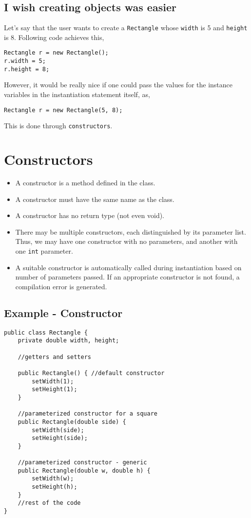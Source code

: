 \subsection{I wish creating objects was easier}

Let's say that the user wants to create a \texttt{Rectangle} whose \texttt{width} is 5 and \texttt{height} is 8. Following code achieves this,

\begin{lstlisting}
Rectangle r = new Rectangle();
r.width = 5;
r.height = 8;
\end{lstlisting}

However, it would be really nice if one could pass the values for the instance variables in the instantiation statement itself, as,

\begin{lstlisting}
Rectangle r = new Rectangle(5, 8);
\end{lstlisting}

This is done through \texttt{constructors}.

\section{Constructors}
\begin{itemize}
\item A constructor is a method defined in the class.
\item A constructor must have the same name as the class.
\item A constructor has no return type (not even void).
\item There may be multiple constructors, each distinguished by its parameter list. Thus, we may have one constructor with no parameters, and another with one \texttt{int} parameter.
\item A suitable constructor is automatically called during instantiation based on number of parameters passed. If an appropriate constructor is not found, a compilation error is generated.
\end{itemize}

\subsection{Example - Constructor}

\begin{lstlisting}[basicstyle=\tiny]
public class Rectangle {
    private double width, height;
    
    //getters and setters

    public Rectangle() { //default constructor
		setWidth(1);
		setHeight(1);
    }

    //parameterized constructor for a square
    public Rectangle(double side) { 
		setWidth(side);
		setHeight(side);
    }

    //parameterized constructor - generic
    public Rectangle(double w, double h) { 
		setWidth(w);
		setHeight(h);
    }
    //rest of the code
}
\end{lstlisting}

